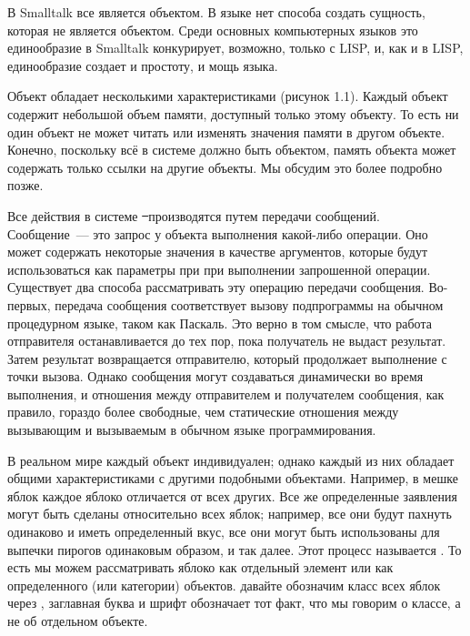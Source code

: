 
В Smalltalk все является объектом. В языке нет способа создать сущность, 
которая не является объектом. Среди основных компьютерных языков это 
единообразие в Smalltalk конкурирует, возможно, только с LISP, и, 
как и в LISP, единообразие создает и простоту, и мощь языка.

Объект обладает несколькими характеристиками (рисунок 1.1). Каждый объект 
содержит небольшой объем памяти, доступный только этому объекту. То есть 
ни один объект не может читать или изменять значения памяти в другом 
объекте. Конечно, поскольку всё в системе должно быть объектом, память 
объекта может содержать только ссылки на другие объекты. Мы обсудим 
это более подробно позже.


Все действия в системе \st\ производятся путем передачи сообщений. 
Сообщение\ --- это запрос у объекта выполнения какой-либо операции. Оно 
может содержать некоторые значения в качестве аргументов, которые будут 
использоваться как параметры при при выполнении запрошенной операции. 
Существует два способа рассматривать эту операцию передачи сообщения. 
Во-первых, передача сообщения соответствует вызову подпрограммы на обычном 
процедурном языке, таком как Паскаль. Это верно в том смысле, что работа 
отправителя останавливается до тех пор, пока получатель не выдаст результат.
Затем результат возвращается отправителю, который продолжает выполнение 
с точки вызова. Однако сообщения могут создаваться динамически во время 
выполнения, и отношения между отправителем и получателем сообщения, как 
правило, гораздо более свободные, чем статические отношения между 
вызывающим и вызываемым в обычном языке программирования.

В реальном мире каждый объект индивидуален; однако каждый из них обладает 
общими характеристиками с другими подобными объектами. Например, в мешке 
яблок каждое яблоко отличается от всех других. Все же определенные заявления 
могут быть сделаны относительно всех яблок; например, все они будут 
пахнуть одинаково и иметь определенный вкус, все они могут быть использованы 
для выпечки пирогов одинаковым образом, и так далее. Этот процесс называется 
. То есть мы можем рассматривать яблоко как отдельный элемент 
или как  определенного  (или категории) объектов. давайте 
обозначим класс всех яблок через , заглавная буква и шрифт обозначает 
тот факт, что мы говорим о классе, а не об отдельном объекте.

